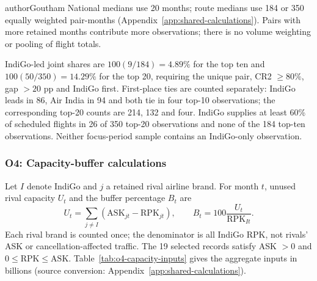 \begin{mergedcontribution}{authorGoutham}
National medians use 20 months; route medians use 184 or 350 equally weighted pair-months (Appendix~\ref{app:shared-calculations}). Pairs with more retained months contribute more observations; there is no volume weighting or pooling of flight totals.

IndiGo-led joint shares are $100(9/184)=4.89\%$ for the top ten and $100(50/350)=14.29\%$ for the top 20, requiring the unique pair, CR2 $\geq80\%$, gap $>20$ pp and IndiGo first.
First-place ties are counted separately: IndiGo leads in 86, Air India in 94 and both tie in four top-10 observations; the corresponding top-20 counts are 214, 132 and four. IndiGo supplies at least 60\% of scheduled flights in 26 of 350 top-20 observations and none of the 184 top-ten observations. Neither focus-period sample contains an IndiGo-only observation.

\subsubsection{O4: Capacity-buffer calculations}
\label{app:o4-capacity-buffer}
Let $I$ denote IndiGo and $j$ a retained rival airline brand. For month $t$, unused rival capacity $U_t$ and the buffer percentage $B_t$ are
\[
U_t=\sum_{j\ne I}(\mathrm{ASK}_{jt}-\mathrm{RPK}_{jt}),
\qquad B_t=100\frac{U_t}{\mathrm{RPK}_{It}}.
\]
Each rival brand is counted once; the denominator is all IndiGo RPK, not rivals' ASK or cancellation-affected traffic. The 19 selected records satisfy ASK $>0$ and $0\leq\mathrm{RPK}\leq\mathrm{ASK}$. Table~\ref{tab:o4-capacity-inputs} gives the aggregate inputs in billions (source conversion: Appendix~\ref{app:shared-calculations}).


\end{mergedcontribution}
